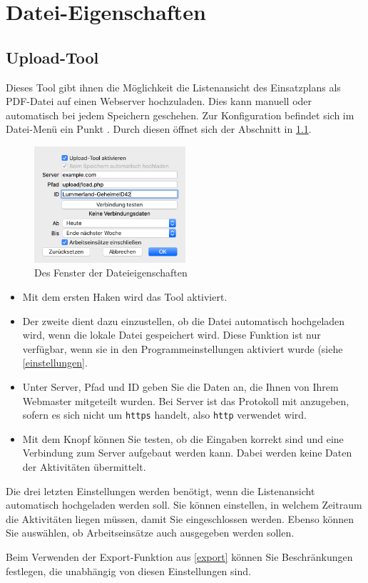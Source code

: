 \chapter{Datei-Eigenschaften}\label{einsatz:eigen}
\section{Upload-Tool}\label{einsatz:eigen:upload}
Dieses Tool gibt ihnen die Möglichkeit die Listenansicht des Einsatzplans als PDF-Datei auf einen Webserver hochzuladen.
Dies kann manuell oder automatisch bei jedem Speichern geschehen.
Zur Konfiguration befindet sich im Datei-Menü ein Punkt .
Durch diesen öffnet sich der Abschnitt in \cref{fig:uploadtool}.
\begin{figure}[!h]
  \centering
	\includegraphics[width=0.5\textwidth]{img/eigenschaften_upload}
	\caption{Des Fenster der Dateieigenschaften}
	\label{fig:uploadtool}
\end{figure}
\begin{itemize}
  \item
  Mit dem ersten Haken wird das Tool aktiviert.
  \item
  Der zweite dient dazu einzustellen, ob die Datei automatisch hochgeladen wird, wenn die lokale Datei gespeichert wird.
  Diese Funktion ist nur verfügbar, wenn sie in den Programmeinstellungen aktiviert wurde (siehe \cref{einstellungen}.
  \item
  Unter Server, Pfad und ID geben Sie die Daten an, die Ihnen von Ihrem Webmaster mitgeteilt wurden.
  Bei Server ist das Protokoll mit anzugeben, sofern es sich nicht um \texttt{https} handelt, also \texttt{http} verwendet wird.
  \item
  Mit dem Knopf können Sie testen, ob die Eingaben korrekt sind und eine Verbindung zum Server aufgebaut werden kann.
  Dabei werden keine Daten der Aktivitäten übermittelt.
\end{itemize}
Die drei letzten Einstellungen werden benötigt, wenn die Listenansicht automatisch hochgeladen werden soll.
Sie können einstellen, in welchem Zeitraum die Aktivitäten liegen müssen, damit Sie eingeschlossen werden.
Ebenso können Sie auswählen, ob Arbeitseinsätze auch ausgegeben werden sollen.

\begin{hinweis}
  Beim Verwenden der Export-Funktion aus \cref{export} können Sie Beschränkungen festlegen, die unabhängig von diesen Einstellungen sind.
\end{hinweis}
